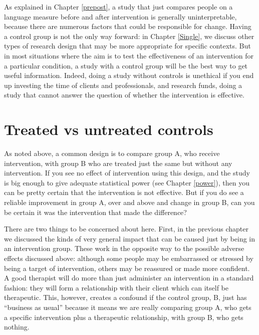 \documentclass{krantz}
\begin{document}
As explained in Chapter \ref{prepost}, a study that just compares people on a language measure before and after intervention is generally uninterpretable, because there are numerous factors that could be responsible for change. Having a control group is not the only way forward: in Chapter \ref{Single}, we discuss other types of research design that may be more appropriate for specific contexts. But in most situations where the aim is to test the effectiveness of an intervention for a particular condition, a study with a control group will be the best way to get useful information. Indeed, doing a study without controls is unethical if you end up investing the time of clients and professionals, and research funds, doing a study that cannot answer the question of whether the intervention is effective.

\hypertarget{treated-vs-untreated-controls}{%
\section{Treated vs untreated controls}\label{treated-vs-untreated-controls}}

As noted above, a common design is to compare group A, who receive intervention, with group B who are treated just the same but without any intervention. If you see no effect of intervention using this design, and the study is big enough to give adequate statistical power (see Chapter \ref{power}), then you can be pretty certain that the intervention is not effective. But if you do see a reliable improvement in group A, over and above and change in group B, can you be certain it was the intervention that made the difference?

There are two things to be concerned about here. First, in the previous chapter we discussed the kinds of very general impact that can be caused just by being in an intervention group. These work in the opposite way to the possible adverse effects discussed above: although some people may be embarrassed or stressed by being a target of intervention, others may be reassured or made more confident. A good therapist will do more than just administer an intervention in a standard fashion: they will form a relationship with their client which can itself be therapeutic. This, however, creates a confound if the control group, B, just has ``business as usual'' because it means we are really comparing group A, who gets a specific intervention plus a therapeutic relationship, with group B, who gets nothing.
\end{document}

